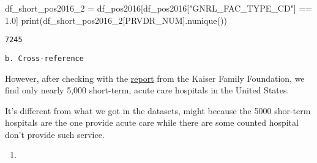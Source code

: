 \documentclass[
  letterpaper,
  DIV=11,
  numbers=noendperiod]{scrartcl}
\newenvironment{Shaded}{\begin{snugshade}}{\end{snugshade}}
\newcommand{\BuiltInTok}[1]{\textcolor[rgb]{0.00,0.23,0.31}{#1}}
\newcommand{\FloatTok}[1]{\textcolor[rgb]{0.68,0.00,0.00}{#1}}
\newcommand{\NormalTok}[1]{\textcolor[rgb]{0.00,0.23,0.31}{#1}}
\newcommand{\OperatorTok}[1]{\textcolor[rgb]{0.37,0.37,0.37}{#1}}
\newcommand{\StringTok}[1]{\textcolor[rgb]{0.13,0.47,0.30}{#1}}
\providecommand{\tightlist}{%
  \setlength{\itemsep}{0pt}\setlength{\parskip}{0pt}}\usepackage{longtable,booktabs,array}
\begin{document}
\begin{Shaded}
\begin{Highlighting}[]
\NormalTok{df\_short\_pos2016\_2 }\OperatorTok{=}\NormalTok{ df\_pos2016[df\_pos2016[}\StringTok{"GNRL\_FAC\_TYPE\_CD"}\NormalTok{] }\OperatorTok{==} \FloatTok{1.0}\NormalTok{]}
\BuiltInTok{print}\NormalTok{(df\_short\_pos2016\_2[}\StringTok{\textquotesingle{}PRVDR\_NUM\textquotesingle{}}\NormalTok{].nunique())}
\end{Highlighting}
\end{Shaded}

\begin{verbatim}
7245
\end{verbatim}

\begin{verbatim}
b. Cross-reference
\end{verbatim}

However, after checking with the
\href{https://www.kff.org/report-section/a-look-at-rural-hospital-closures-and-implications-for-access-to-care-three-case-studies-issue-brief/}{report}
from the Kaiser Family Foundation, we find only nearly 5,000 short-term,
acute care hospitals in the United States.

It's different from what we got in the datasets, might because the 5000
shor-term hospitals are the one provide acute care while there are some
counted hospital don't provide such service.

\begin{enumerate}
\def\labelenumi{\arabic{enumi}.}
\setcounter{enumi}{2}
\tightlist
\item
\end{enumerate}
\end{document}
